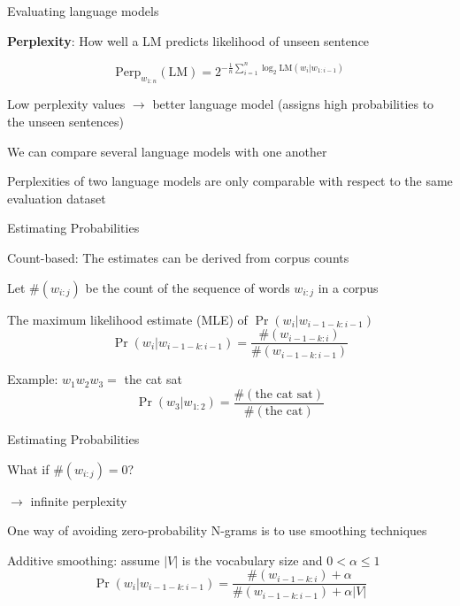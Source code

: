 \documentclass[12pt]{beamer}
\begin{document}
\begin{frame}{Evaluating language models}

\textbf{Perplexity}: How well a LM predicts likelihood of unseen sentence

		\begin{equation*}
		\text{Perp}_{w_{1:n}} (\text{LM}) = 2^{-\frac{1}{n} \sum_{i=1}^{n} \log_2 \text{LM}({w_i|w_{1:i-1}})}
		\end{equation*}

Low perplexity values $\to$ better language model (assigns high probabilities to the unseen sentences)
		
We can compare several language models with one another

Perplexities of two language models are only comparable with respect to the same evaluation dataset

\end{frame}
\begin{frame}{Estimating Probabilities}

Count-based: The estimates can be derived from corpus counts


Let $\#(w_{i:j})$ be the count of the sequence of words $w_{i:j}$ in a corpus

The maximum likelihood estimate (MLE) of $\Pr(w_{i}|w_{i-1-k:i-1})$
		\begin{equation*}
		\Pr(w_{i}|w_{i-1-k:i-1}) = \frac{\#(w_{i-1-k:i})}{\#(w_{i-1-k:i-1})}
		\end{equation*}

Example: $w_1w_2w_3 =$ the cat sat
		\begin{equation*}
		\Pr(w_{3}|w_{1:2}) = \frac{\#(\text{the cat sat})}{\#(\text{the cat})}
		\end{equation*}

\end{frame}
\begin{frame}{Estimating Probabilities}

What if $\#(w_{i:j}) =0 $?  

\pause

$\to$ infinite perplexity 

One way of avoiding zero-probability N-grams is to use smoothing techniques

Additive smoothing: assume $|V|$ is  the vocabulary size and $0<\alpha \leq 1$
\begin{equation*}
\Pr(w_{i}|w_{i-1-k:i-1}) = \frac{\#(w_{i-1-k:i}) + \alpha}{\#(w_{i-1-k:i-1}) + \alpha|V|}
\end{equation*}
		

\end{frame}
\end{document}
